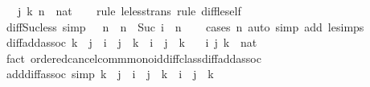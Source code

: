 \begin{isabellebody}
\ \ \ j\ k\ n\ {\isacharcolon}{\kern0pt}{\isacharcolon}{\kern0pt}\ nat\isanewline
%
\isadelimproof
\ \ %
\endisadelimproof
%
\isatagproof
{}\isamarkupfalse%
\ {\isacharparenleft}{\kern0pt}rule\ le{\isacharunderscore}{\kern0pt}less{\isacharunderscore}{\kern0pt}trans{\isacharcomma}{\kern0pt}\ rule\ diff{\isacharunderscore}{\kern0pt}le{\isacharunderscore}{\kern0pt}self{\isacharparenright}{\kern0pt}%
\endisatagproof
{\isafoldproof}%
%
\isadelimproof
\isanewline
%
\endisadelimproof
\isanewline
{}\isamarkupfalse%
\ diff{\isacharunderscore}{\kern0pt}Suc{\isacharunderscore}{\kern0pt}less\ {\isacharbrackleft}{\kern0pt}simp{\isacharbrackright}{\kern0pt}{\isacharcolon}{\kern0pt}\ {\isachardoublequoteopen}{}\ {\isacharless}{\kern0pt}\ n\ {\isasymLongrightarrow}\ n\ {\isacharminus}{\kern0pt}\ Suc\ i\ {\isacharless}{\kern0pt}\ n{\isachardoublequoteclose}\isanewline
%
\isadelimproof
\ \ %
\endisadelimproof
%
\isatagproof
{}\isamarkupfalse%
\ {\isacharparenleft}{\kern0pt}cases\ n{\isacharparenright}{\kern0pt}\ {\isacharparenleft}{\kern0pt}auto\ simp\ add{\isacharcolon}{\kern0pt}\ le{\isacharunderscore}{\kern0pt}simps{\isacharparenright}{\kern0pt}%
\endisatagproof
{\isafoldproof}%
%
\isadelimproof
\isanewline
%
\endisadelimproof
\isanewline
{}\isamarkupfalse%
\ diff{\isacharunderscore}{\kern0pt}add{\isacharunderscore}{\kern0pt}assoc{\isacharcolon}{\kern0pt}\ {\isachardoublequoteopen}k\ {\isasymle}\ j\ {\isasymLongrightarrow}\ {\isacharparenleft}{\kern0pt}i\ {\isacharplus}{\kern0pt}\ j{\isacharparenright}{\kern0pt}\ {\isacharminus}{\kern0pt}\ k\ {\isacharequal}{\kern0pt}\ i\ {\isacharplus}{\kern0pt}\ {\isacharparenleft}{\kern0pt}j\ {\isacharminus}{\kern0pt}\ k{\isacharparenright}{\kern0pt}{\isachardoublequoteclose}\isanewline
\ \ \ i\ j\ k\ {\isacharcolon}{\kern0pt}{\isacharcolon}{\kern0pt}\ nat\isanewline
%
\isadelimproof
\ \ %
\endisadelimproof
%
\isatagproof
{}\isamarkupfalse%
\ {\isacharparenleft}{\kern0pt}fact\ ordered{\isacharunderscore}{\kern0pt}cancel{\isacharunderscore}{\kern0pt}comm{\isacharunderscore}{\kern0pt}monoid{\isacharunderscore}{\kern0pt}diff{\isacharunderscore}{\kern0pt}class{\isachardot}{\kern0pt}diff{\isacharunderscore}{\kern0pt}add{\isacharunderscore}{\kern0pt}assoc{\isacharparenright}{\kern0pt}%
\endisatagproof
{\isafoldproof}%
%
\isadelimproof
\ \isanewline
%
\endisadelimproof
\isanewline
{}\isamarkupfalse%
\ add{\isacharunderscore}{\kern0pt}diff{\isacharunderscore}{\kern0pt}assoc\ {\isacharbrackleft}{\kern0pt}simp{\isacharbrackright}{\kern0pt}{\isacharcolon}{\kern0pt}\ {\isachardoublequoteopen}k\ {\isasymle}\ j\ {\isasymLongrightarrow}\ i\ {\isacharplus}{\kern0pt}\ {\isacharparenleft}{\kern0pt}j\ {\isacharminus}{\kern0pt}\ k{\isacharparenright}{\kern0pt}\ {\isacharequal}{\kern0pt}\ i\ {\isacharplus}{\kern0pt}\ j\ {\isacharminus}{\kern0pt}\ k{\isachardoublequoteclose}\isanewline

\end{isabellebody}
